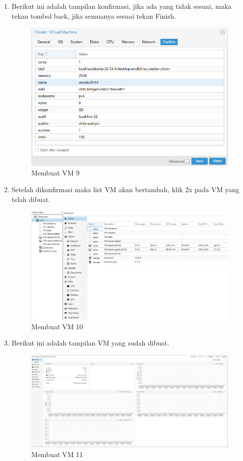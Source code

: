 \documentclass{article}
\begin{document}
\begin{enumerate}
  \item Berikut ini adalah tampilan konfirmasi, jika ada yang tidak sesuai, maka tekan tombol back, jika semuanya sesuai tekan Finish.
  \begin{figure}[h!]
    \centering
    \includegraphics[width=0.7\linewidth]{create vm 9.png}
    \caption{Membuat VM 9}
  \end{figure}
  \item Setelah dikonfirmasi maka list VM akan bertambah, klik 2x pada VM yang telah dibuat. 
  \begin{figure}[h!]
    \centering
    \includegraphics[width=0.7\linewidth]{create vm 10.png}
    \caption{Membuat VM 10}
  \end{figure}
  \newpage

  \item Berikut ini adalah tampilan VM yang sudah dibuat.
  \begin{figure}[h!]
    \centering
    \includegraphics[width=0.7\linewidth]{create vm 11.png}
    \caption{Membuat VM 11}
  \end{figure}
  \end{enumerate}
\end{document}
